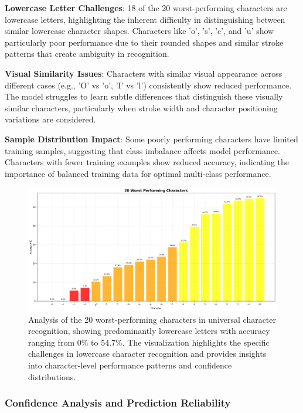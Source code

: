 \documentclass[11pt,a4paper]{report}
\begin{document}
\textbf{Lowercase Letter Challenges}: 18 of the 20 worst-performing characters are lowercase letters, highlighting the inherent difficulty in distinguishing between similar lowercase character shapes. Characters like 'o', 's', 'c', and 'u' show particularly poor performance due to their rounded shapes and similar stroke patterns that create ambiguity in recognition.

\textbf{Visual Similarity Issues}: Characters with similar visual appearance across different cases (e.g., 'O' vs 'o', 'I' vs 'l') consistently show reduced performance. The model struggles to learn subtle differences that distinguish these visually similar characters, particularly when stroke width and character positioning variations are considered.

\textbf{Sample Distribution Impact}: Some poorly performing characters have limited training samples, suggesting that class imbalance affects model performance. Characters with fewer training examples show reduced accuracy, indicating the importance of balanced training data for optimal multi-class performance.

\begin{figure}[H]
\centering
\includegraphics[width=\textwidth]{worst_characters.png}
\caption{Analysis of the 20 worst-performing characters in universal character recognition, showing predominantly lowercase letters with accuracy ranging from 0\% to 54.7\%. The visualization highlights the specific challenges in lowercase character recognition and provides insights into character-level performance patterns and confidence distributions.}
\label{fig:worst_characters}
\end{figure}

\subsubsection{Confidence Analysis and Prediction Reliability}
\end{document}
